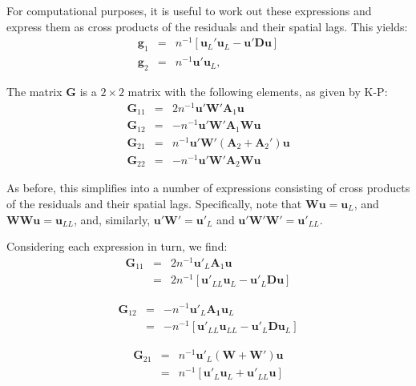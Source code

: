 \documentclass{article}
\begin{document}
For computational purposes, it is useful to work out these
expressions and express them as cross products of the residuals and their
spatial lags. This yields:
\begin{eqnarray*}
 \mathbf{g}_1 &=& n^{-1} [ \mathbf{u}_L' \mathbf{u}_L - \mathbf{u}' \mathbf{D} \mathbf{u} ]\\
  \mathbf{g}_2 &=& n^{-1} \mathbf{u}' \mathbf{u}_L,
\end{eqnarray*}

The matrix $\mathbf{G}$ is a $2 \times 2$ matrix with the following elements,
as given by K-P:
\begin{eqnarray*}
\mathbf{G}_{11} &=& 2n^{-1} \mathbf{u}' \mathbf{W'} \mathbf{A}_1 \mathbf{u}\\
\mathbf{G}_{12} &=& - n^{-1} \mathbf{u}' \mathbf{W'} \mathbf{A}_1 \mathbf{W} \mathbf{u}\\
\mathbf{G}_{21} &=& n^{-1} \mathbf{u}' \mathbf{W'} ( \mathbf{A}_2 + \mathbf{A}_2 ' ) \mathbf{u}\\
\mathbf{G}_{22} &=& - n^{-1} \mathbf{u}' \mathbf{W'} \mathbf{A}_2 \mathbf{W} \mathbf{u}
\end{eqnarray*}

As before, this simplifies into a number of expressions consisting of cross products
of the residuals and their spatial lags. Specifically, note that $\mathbf{Wu} = \mathbf{u}_L$,
and $\mathbf{WWu} = \mathbf{u}_{LL}$, and, similarly, $\mathbf{u'W'} = \mathbf{u'}_L$
and $\mathbf{u'W'W'} = \mathbf{u'}_{LL}$.

Considering each expression in turn, we find:
\begin{eqnarray}
\mathbf{G}_{11} &=& 2 n^{-1} \mathbf{u'}_L \mathbf{A}_1 \mathbf{u}\label{eq:G11}\\
    &=& 2 n^{-1} [ \mathbf{u'}_{LL} \mathbf{u}_L - \mathbf{u'}_L \mathbf{D} \mathbf{u} ]\nonumber
\end{eqnarray}

\begin{eqnarray}
\mathbf{G}_{12} &=& - n^{-1} \mathbf{u'}_L \mathbf{A_1} \mathbf{u}_L\label{eq:G12}\\
   &=& - n^{-1} [ \mathbf{u'}_{LL} \mathbf{u}_{LL} - \mathbf{u'}_L \mathbf{D} \mathbf{u}_L ]\nonumber
\end{eqnarray}

\begin{eqnarray}
 \mathbf{G}_{21} &=& n^{-1} \mathbf{u'}_L (\mathbf{W} + \mathbf{W'}) \mathbf{u} \label{eq:G21}\\
   &=& n^{-1} [ \mathbf{u'}_L \mathbf{u}_L + \mathbf{u'}_{LL} \mathbf{u} ]\nonumber
\end{eqnarray}
\end{document}
